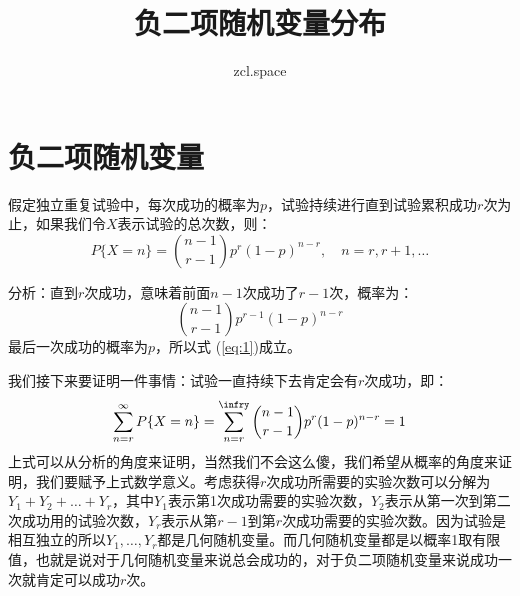 \documentclass[10pt,a4paper,UTF8]{article}
\author{zcl.space}
\date{}
\title{负二项随机变量分布}
\begin{document}
\maketitle
\tableofcontents
{}

\section{负二项随机变量}
\label{sec:orgd79b8cc}


假定独立重复试验中，每次成功的概率为\(p\)，试验持续进行直到试验累积成功\(r\)次为止，如果我们令\(X\)表示试验的总次数，则：
\begin{equation}
\label{eq:1}
P\{X=n\} = \binom{n-1}{r-1} p^{r}(1-p)^{n-r}, \quad n= r,r+1,\ldots
\end{equation}

分析：直到\(r\)次成功，意味着前面\(n-1\)次成功了\(r-1\)次，概率为：\[\binom{n-1}{r-1}p^{r-1}(1-p)^{n-r}\]最后一次成功的概率为\(p\)，所以式 (\ref{eq:1})成立。

我们接下来要证明一件事情：试验一直持续下去肯定会有\(r\)次成功，即：
\begin{equation}
\label{eq:2}
\sum_{n=r}^{\infty}P\{X=n\} = \sum_{n=r}^{\infry} \binom{n-1}{r-1}p^{r}(1-p)^{n-r} = 1
\end{equation}
上式可以从分析的角度来证明，当然我们不会这么傻，我们希望从概率的角度来证明，我们要赋予上式数学意义。考虑获得\(r\)次成功所需要的实验次数可以分解为\(Y_{1} +Y_{2} + \ldots + Y_{r}\)，其中\(Y_{1}\)表示第1次成功需要的实验次数，\(Y_{2}\)表示从第一次到第二次成功用的试验次数，\(Y_{r}\)表示从第\(r-1\)到第\(r\)次成功需要的实验次数。因为试验是相互独立的所以\(Y_{1},\ldots ,Y_{r}\)都是几何随机变量。而几何随机变量都是以概率1取有限值，也就是说对于几何随机变量来说总会成功的，对于负二项随机变量来说成功一次就肯定可以成功\(r\)次。
\end{document}
